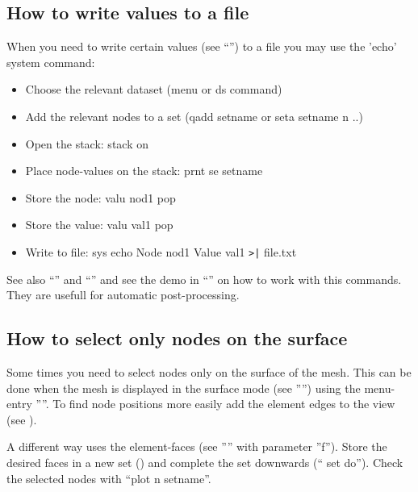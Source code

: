 \documentclass{article}
\begin{document}
\begin{appendix}
\subsection{\label{How to write values to a file}How to write values to a file}
When you need to write certain values (see ``'') to a file you may use the 'echo' system command:
\begin{itemize}
\item Choose the relevant dataset (menu or ds command)
\item Add the relevant nodes to a set (qadd setname or seta setname n ..) 
\item Open the stack: stack on
\item Place node-values on the stack: prnt se setname
\item Store the node: valu nod1 pop 
\item Store the value: valu val1 pop 
\item Write to file: sys echo Node nod1 Value val1 \verb_>|_ file.txt
\end{itemize}
See also ``'' and ``'' and see the demo in ``'' on how to work with this commands. They are usefull for automatic post-processing.

\subsection{\label{How to select only nodes on the surface}How to select only nodes on the surface}
Some times you need to select nodes only on the surface of the mesh. This can be done when the mesh is displayed in the surface mode (see '''') using the menu-entry ''''. To find node positions more easily add the element edges to the view (see ).

A different way uses the element-faces (see '''' with parameter ''f''). Store the desired faces in a new set () and complete the set downwards (`` set do''). Check the selected nodes with ``plot n setname''. 


\end{appendix}
\end{document}
